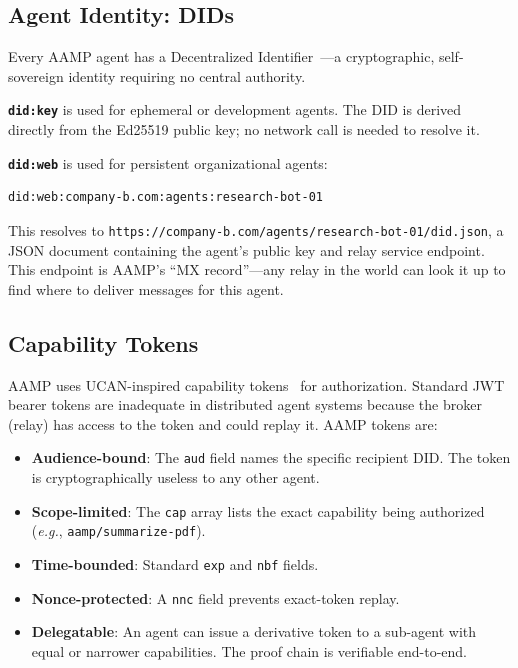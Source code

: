 \documentclass[11pt,a4paper]{article}
\begin{document}
\subsection{Agent Identity: DIDs}
\label{sec:did}

Every AAMP agent has a Decentralized Identifier~\cite{w3cdid2022}---a cryptographic,
self-sovereign identity requiring no central authority.

\textbf{\texttt{did:key}} is used for ephemeral or development agents. The DID is
derived directly from the Ed25519 public key; no network call is needed to resolve it.

\textbf{\texttt{did:web}} is used for persistent organizational agents:
\begin{lstlisting}[numbers=none]
did:web:company-b.com:agents:research-bot-01
\end{lstlisting}
This resolves to \texttt{https://company-b.com/agents/research-bot-01/did.json},
a JSON document containing the agent's public key and relay service endpoint.
This endpoint is AAMP's ``MX record''---any relay in the world can look it up
to find where to deliver messages for this agent.

\subsection{Capability Tokens}
\label{sec:ucan}

AAMP uses UCAN-inspired capability tokens~\cite{ucan2022} for authorization.
Standard JWT bearer tokens are inadequate in distributed agent systems because the
broker (relay) has access to the token and could replay it. AAMP tokens are:

\begin{itemize}[leftmargin=*]
  \item \textbf{Audience-bound}: The \texttt{aud} field names the specific recipient
    DID. The token is cryptographically useless to any other agent.
  \item \textbf{Scope-limited}: The \texttt{cap} array lists the exact capability
    being authorized (\emph{e.g.}, \texttt{aamp/summarize-pdf}).
  \item \textbf{Time-bounded}: Standard \texttt{exp} and \texttt{nbf} fields.
  \item \textbf{Nonce-protected}: A \texttt{nnc} field prevents exact-token replay.
  \item \textbf{Delegatable}: An agent can issue a derivative token to a sub-agent
    with equal or narrower capabilities. The proof chain is verifiable end-to-end.
\end{itemize}
\end{document}
